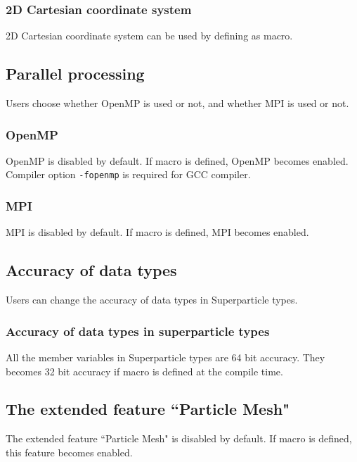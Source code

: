 \subsubsection{2D Cartesian coordinate system}
2D Cartesian coordinate system can be used by defining  as macro.

\subsection{Parallel processing}
\label{subsec:macro_parallel}
Users choose whether OpenMP is used or not, and whether MPI is used or not.

\subsubsection{OpenMP}
OpenMP is disabled by default. If macro  is defined, OpenMP becomes enabled. Compiler option \texttt{-fopenmp} is required for GCC compiler.

\subsubsection{MPI}
MPI is disabled by default. If macro  is defined, MPI becomes enabled.

\subsection{Accuracy of data types}
\label{subsec:macro_FP_accuracy}
Users can change the accuracy of data types in Superparticle types.

\subsubsection{Accuracy of data types in superparticle types}
All the member variables in Superparticle types are 64 bit accuracy. They becomes 32 bit accuracy if macro  is defined at the compile time.

\subsection{The extended feature ``Particle Mesh"}
\label{subsec:macro_PM}
The extended feature ``Particle Mesh" is disabled by default. If macro  is defined, this feature becomes enabled.

